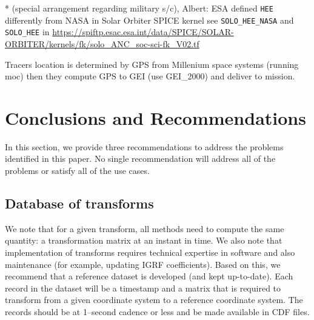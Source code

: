 \documentclass[draft]{agujournal2019}
\begin{document}
* (special arrangement regarding military s/c),
Albert: ESA defined \texttt{HEE} differently from NASA in Solar Orbiter SPICE kernel see \texttt{SOLO\_HEE\_NASA} and \texttt{SOLO\_HEE} in \url{https://spiftp.esac.esa.int/data/SPICE/SOLAR-ORBITER/kernels/fk/solo_ANC_soc-sci-fk_V02.tf}






Tracers location is determined by GPS from Millenium space systems (running moc) then they compute GPS to GEI (use GEI_2000) and deliver to mission.

\section{Conclusions and Recommendations}
\label{sect:conclusions}

In this section, we provide three recommendations to address the problems identified in this paper. No single recommendation will address all of the problems or satisfy all of the use cases.

\subsection{Database of transforms}

We note that for a given transform, all methods need to compute the same quantity: a transformation matrix at an instant in time. We also note that implementation of transforms requires technical expertise in software and also maintenance (for example, updating IGRF coefficients). Based on this, we recommend that a reference dataset is developed (and kept up-to-date). Each record in the dataset will be a timestamp and a matrix that is required to transform from a given coordinate system to a reference coordinate system. The records should be at 1--second cadence or less and be made available in CDF files.
\end{document}

